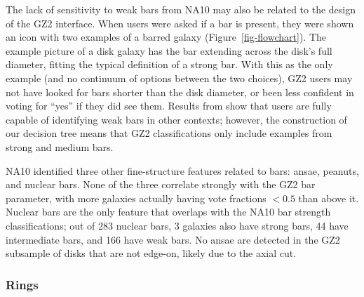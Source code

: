 \documentclass[useAMS,usenatbib]{mn2e}
\begin{document}
The lack of sensitivity to weak bars from NA10 may also be related to the design of the GZ2 interface. When users were asked if a bar is present, they were shown an icon with two examples of a barred galaxy (Figure~\ref{fig-flowchart}). The example picture of a disk galaxy has the bar extending across the disk's full diameter, fitting the typical definition of a strong bar. With this as the only example (and no continuum of options between the two choices), GZ2 users may not have looked for bars shorter than the disk diameter, or been less confident in voting for ``yes'' if they did see them. Results from \citet{hoy11} show that users are fully capable of identifying weak bars in other contexts; however, the construction of our decision tree means that GZ2 classifications only include examples from strong and medium bars. 

NA10 identified three other fine-structure features related to bars: ansae, peanuts, and nuclear bars. None of the three correlate strongly with the GZ2 bar parameter, with more galaxies actually having vote fractions $<0.5$ than above it. Nuclear bars are the only feature that overlaps with the NA10 bar strength classifications; out of 283 nuclear bars, 3 galaxies also have strong bars, 44 have intermediate bars, and 166 have weak bars. No ansae are detected in the GZ2 subsample of disks that are not edge-on, likely due to the axial cut. 



\subsubsection{Rings}
\end{document}
